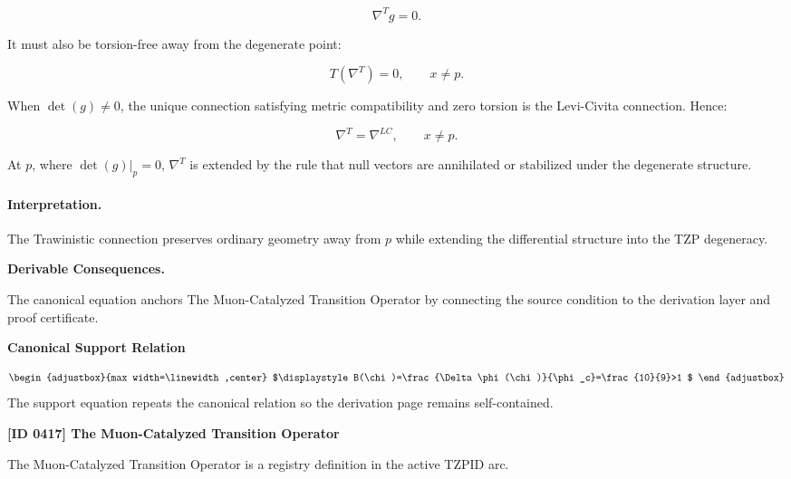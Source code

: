 \begin{equation}
\nabla^{T}g=0 .
\end{equation}

It must also be torsion-free away from the degenerate point:

\begin{equation}
T(\nabla^{T})=0,
\qquad x\neq p .
\end{equation}

When $\det(g)\neq 0$, the unique connection satisfying metric compatibility and zero torsion is the Levi-Civita connection. Hence:

\begin{equation}
\nabla^{T}=\nabla^{LC},
\qquad x\neq p .
\end{equation}

At $p$, where $\det(g)|_p=0$, $\nabla^{T}$ is extended by the rule that null vectors are annihilated or stabilized under the degenerate structure.

\paragraph{Interpretation.}
The Trawinistic connection preserves ordinary geometry away from $p$ while extending the differential structure into the TZP degeneracy.

\par\vspace{0.35em}
\noindent\textbf{Derivable Consequences.}\quad
\begingroup
\footnotesize
\raggedright
The canonical equation anchors The Muon-Catalyzed Transition Operator by connecting the source condition to the derivation layer and proof certificate.
\par\endgroup

\noindent\textbf{Canonical Support Relation}\par
\[
\begin{adjustbox}{max width=\linewidth,center}
$\displaystyle
B(\chi)=\frac{\Delta\phi(\chi)}{\phi_c}=\frac{10}{9}>1
$
\end{adjustbox}
\]
\noindent The support equation repeats the canonical relation so the derivation page remains self-contained.\par

\clearpage
\noindent\textbf{[ID 0417] The Muon-Catalyzed Transition Operator}\par
\vspace{0.35em}
\begingroup\small
{}
The Muon-Catalyzed Transition Operator is a registry definition in the active TZPID arc.

